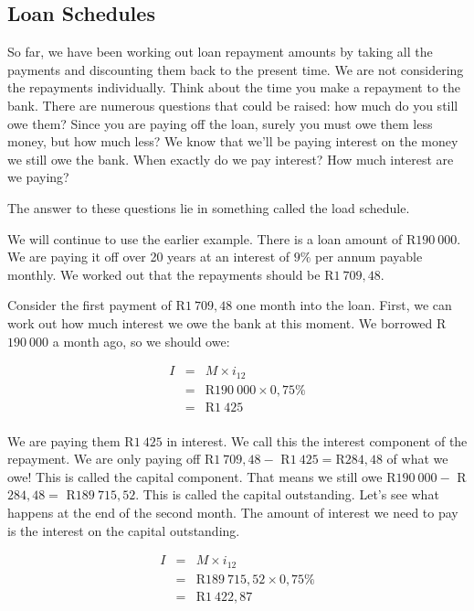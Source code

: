 \subsection{Loan Schedules}
\label{ss:loadschedules}

So far, we have been working out loan repayment amounts by taking all the payments and discounting them back to the present time. We are not considering the repayments individually. Think about the time you make a repayment to the bank. There are numerous questions that could be raised: how much do you still owe them? Since you are paying off the loan, surely you must owe them less money, but how much less? We know that we'll be paying interest on the money we still owe the bank. When exactly do we pay interest? How much interest are we paying?

The answer to these questions lie in something called the load schedule.

We will continue to use the earlier example. There is a loan amount of R$190~000$. We are paying it off over 20 years at an interest of $9\%$ per annum payable monthly. We worked out that the repayments should be R$1~709,48$.

Consider the first payment of R$1~709,48$ one month into the loan. First, we can work out how much interest we owe the bank at this moment. We borrowed R$190~000$ a month ago, so we should owe:

\begin{eqnarray*}
I &=& M \times i_{12}\\
&=& \mbox{R}190~000 \times 0,75\%\\
&=& \mbox{R}1~425\\
\end{eqnarray*}

We are paying them R$1~425$ in interest. We call this the interest component of the repayment. We are only paying off R$1~709,48 -$ R$1~425 = $R$284,48$ of what we owe! This is called the capital component. That means we still owe R$190~000 -$ R$284,48 =$ R$189~715,52$. This is called the capital outstanding. Let's see what happens at the end of the second month. The amount of interest we need to pay is the interest on the capital outstanding.

\begin{eqnarray*}
I &=& M \times i_{12}\\
&=& \mbox{R}189~715,52 \times 0,75\%\\
&=& \mbox{R}1~422,87\\
\end{eqnarray*}

